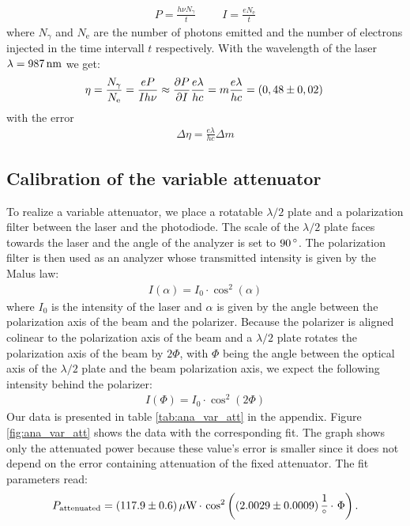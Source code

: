 \documentclass{protokoll_en}
\begin{document}
\begin{align}
P = \frac{h\nu N_\gamma}{t}\hspace{1cm} I = \frac{eN_\textrm{e}}{t}
\end{align}
where $N_\gamma$ and $N_\textrm{e}$ are the number of photons emitted and the number of electrons injected in the time intervall $t$ respectively. With the wavelength of the laser $\lambda = \unit[987]{nm}$ we get:
\begin{align}
\eta = \frac{N_\gamma}{N_\textrm{e}} = \frac{eP}{Ih\nu} \approx \frac{\partial P}{\partial I}\frac{e\lambda}{hc} = m\frac{e\lambda}{hc} = \unit[(0,48 \pm 0,02)]{}
\end{align}
with the error
\begin{align}
\Delta \eta = \frac{e\lambda}{hc}\Delta m
\end{align}
\subsection{Calibration of the variable attenuator}\label{subsec:var_att_calib}
To realize a variable attenuator, we place a rotatable $\lambda /2$ plate and a polarization filter between the laser and the photodiode. The scale of the $\lambda /2$ plate faces towards the laser and the angle of the analyzer is set to $\unit[90]{^\circ}$. The polarization filter is then used as an analyzer whose transmitted intensity is given by the Malus law:
\begin{align*}
I(\alpha)=I_0\cdot\cos^2(\alpha)
\end{align*}
where $I_0$ is the intensity of the laser and $\alpha$ is given by the angle between the polarization axis of the beam and the polarizer. Because the polarizer is aligned colinear to the polarization axis of the beam and a $\lambda /2$ plate rotates the polarization axis of the beam by $2\Phi$, with $\Phi$ being the angle between the optical axis of the $\lambda /2$ plate and the beam polarization axis, we expect the following intensity behind the polarizer:
\begin{align*}
I(\Phi)=I_0\cdot\cos^2(2\Phi)
\end{align*}
Our data is presented in table \ref{tab:ana_var_att} in the appendix. Figure \ref{fig:ana_var_att} shows the data with the corresponding fit. The graph shows only the attenuated power because these value's error is smaller since it does not depend on the error containing attenuation of the fixed attenuator. The fit parameters read:
\begin{align*}
P_\textrm{attenuated} = \unit[(117.9 \pm 0.6)]{\mu W}\,\cdotp\,\cos^2\left(\unit[(2.0029 \pm 0.0009)]{\frac{1}{^\circ}} \,\cdotp\, \Phi\right)\textrm{.}
\end{align*}
\end{document}

